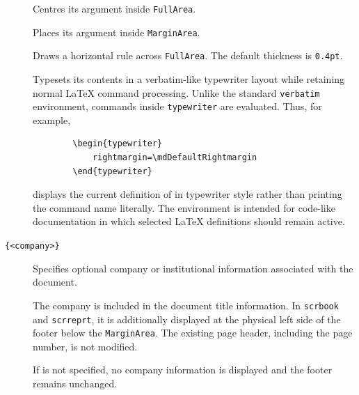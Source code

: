 \documentclass[
11pt,
a4paper,
oneside
]{scrbook}
\begin{document}
\begin{description}
	
	\item[]
	Centres its argument inside \texttt{FullArea}.
	
	\item[]
	Places its argument inside \texttt{MarginArea}.
	
	\item[\cmdsyntax{\fullrule[<thickness>]}]
	Draws a horizontal rule across \texttt{FullArea}.
	The default thickness is \texttt{0.4pt}.
	
	\item[]
	Typesets its contents in a verbatim-like typewriter layout while
	retaining normal \LaTeX{} command processing.
	Unlike the standard \texttt{verbatim} environment, commands inside
	\texttt{typewriter} are evaluated. Thus, for example,	
	\begin{verbatim}
		\begin{typewriter}
			rightmargin=\mdDefaultRightmargin
		\end{typewriter}
	\end{verbatim}	
	displays the current definition of
	\texttt{\string\mdDefaultRightmargin} in typewriter style rather than
	printing the command name literally.
	The environment is intended for code-like documentation in which
	selected \LaTeX{} definitions should remain active.
	
	\item[\texttt{\string\company\{<company>\}}]
	Specifies optional company or institutional information associated
	with the document.
	
	The company is included in the document title information. In
	\texttt{scrbook} and \texttt{scrreprt}, it is additionally displayed
	at the physical left side of the footer below the \texttt{MarginArea}.
	The existing page header, including the page number, is not modified.
	
	If \texttt{\string\company} is not specified, no company information
	is displayed and the footer remains unchanged.
	
\end{description}
	
\end{document}
